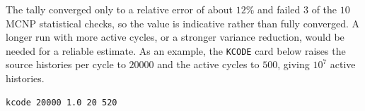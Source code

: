 The tally converged only to a relative error of about $12\%$ and failed $3$ of the $10$ MCNP statistical checks, so the value is indicative rather than fully converged.
A longer run with more active cycles, or a stronger variance reduction, would be needed for a reliable estimate.
As an example, the \texttt{KCODE} card below raises the source histories per cycle to $20000$ and the active cycles to $500$, giving $10^{7}$ active histories.

\begin{lstlisting}[numbers=none]
kcode 20000 1.0 20 520
\end{lstlisting}
